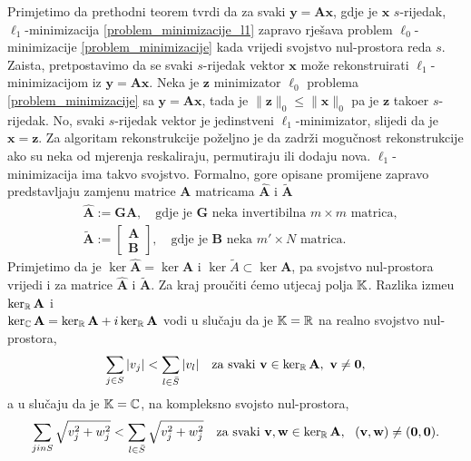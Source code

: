 \documentclass[a4paper,twoside,12pt]{memoir} %
\newcommand{\vect}[1]{\mathbf{#1}}
\renewcommand{\vec}{\vect}
\newcommand{\norm}[1]{\|{#1}\|}
\begin{document}
Primjetimo da prethodni teorem tvrdi da za svaki $\vec y = \vec{Ax}$, gdje je $\vec x$ $s$-rijedak, $\ell_1$-minimizacija \eqref{problem_minimizacije_l1} zapravo rje\v{s}ava problem $\ell_0$-minimizacije \eqref{problem_minimizacije} kada vrijedi svojstvo nul-prostora reda $s$. Zaista, pretpostavimo da se svaki $s$-rijedak vektor $\vec{x}$ mo\v{z}e rekonstruirati $\ell_1$-minimizacijom iz $\vec y = \vec{Ax}$. Neka je $\vec z$ minimizator $\ell_0$ problema \eqref{problem_minimizacije} sa $\vec y = \vec{Ax}$, tada je $\norm{\vec z}_0 \leq \norm{\vec x}_0$ pa je $\vec z$ tako\dj er $s$-rijedak. No, svaki $s$-rijedak vektor je jedinstveni $\ell_1$-minimizator, slijedi da je $\vec x = \vec z$.
\newline \indent
Za algoritam rekonstrukcije po\v{z}eljno je da zadr\v{z}i mogu\v{c}nost rekonstrukcije ako su neka od mjerenja reskaliraju, permutiraju ili dodaju nova. $\ell_1$-minimizacija ima takvo svojstvo. Formalno, gore opisane promijene zapravo predstavljaju zamjenu matrice $\vec A$ matricama $\vec{\hat A}$ i $\vec{\tilde A}$
\begin{align*}
    & \vec{\hat A} := \vec{GA}, \quad \text{gdje je }\vec{G}\text{ neka invertibilna }m \times m \text{ matrica},\\
    & \vec{\tilde A} := 
    \begin{bmatrix*}
        \vec A \\ \vec B
    \end{bmatrix*}
    , \quad \text{gdje je }\vec{B}\text{ neka }m' \times N \text{ matrica}.
\end{align*}
Primjetimo da je $\ker \vec{\hat A} = \ker \vec A$ i $\ker \tilde A \subset \ker \vec A$, pa svojstvo nul-prostora vrijedi i za matrice $\vec{\hat A}$ i $\vec{\tilde A}$.
\newline
\newline
\indent
Za kraj prou\v{c}iti \'cemo utjecaj polja $\mathbb{K}$. Razlika izme\dj u $\ker_{\R}\vec A$ i\\ $\ker_{\C} \vec A = \ker_{\R} \vec A + i \ker_{\R} \vec A$ vodi u slu\v{c}aju da je $\mathbb{K}=\mathbb{R}$ na realno svojstvo nul-prostora, 
\begin{equation}\label{svojstvo_nul_prostora_realno}
    \sum_{j \in S}|v_j| < \sum_{l \in \bar{S}}|v_l| \quad \text{za svaki } \vec v \in \ker_{\R} \vec A,\ \vec v \neq \vec 0,  
\end{equation}
a u slu\v{c}aju da je $\mathbb{K} = \mathbb{C}$, na kompleksno svojsto nul-prostora,
\begin{equation}\label{svojstvo_nul_prostora_kompleksno}
    \sum_{j in S}\sqrt{v_j^2 + w_j^2} < \sum_{l \in \bar{S}}\sqrt{v_j^2 + w_j^2}\quad \text{za svaki } \vec v, \vec w \in \ker_{\R} \vec A,\ \ ( \vec v, \vec w ) \neq \vec (\vec 0,\vec 0).  
\end{equation}
\end{document}
